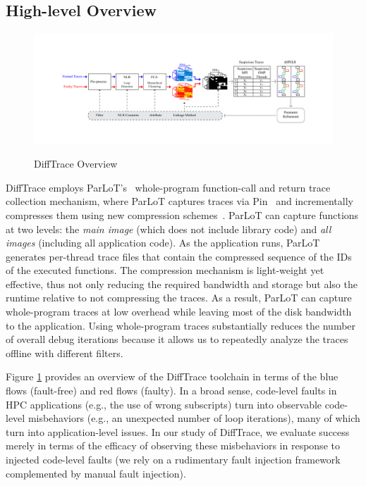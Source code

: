 \subsection{High-level Overview}

\begin{figure}[]
\caption{DiffTrace Overview}
\includegraphics[width=1\textwidth]{figs/overview2.pdf}
\label{fig.diffTraceOverview}
\end{figure}

DiffTrace employs
ParLoT's~\cite{ParLoT} whole-program function-call and return trace collection
mechanism, where ParLoT captures traces
via Pin~\cite{pin} and incrementally compresses them using new
compression schemes~\cite{martin-compression-paper}.
%
ParLoT can capture functions at two levels:
the \textit{main image} (which does not include library code)
and \textit{all images} (including all application code).
%
As the application runs,
ParLoT generates per-thread trace files that
contain the compressed sequence of the IDs of the executed functions.
%
The compression mechanism is light-weight yet effective,
thus not only reducing the required bandwidth and storage but also the
runtime relative to not compressing the traces.
As a result, ParLoT can capture whole-program traces at low overhead
while leaving most of the disk bandwidth to the application. 
%
Using whole-program traces substantially reduces the number of overall
debug iterations because it allows us to repeatedly analyze the
traces offline with different filters.


Figure \ref{fig.diffTraceOverview} provides an overview
of the DiffTrace toolchain
in terms of the blue flows (fault-free) and red flows
(faulty).
%
In a broad sense,
code-level faults in HPC applications (e.g.,
the use of wrong subscripts) turn into observable code-level
misbehaviors
(e.g., an unexpected number of loop iterations), many of which
turn into application-level issues.
%
In our study of DiffTrace, we evaluate
success merely in terms of the efficacy of observing
these misbehaviors in response to injected code-level
faults (we rely on a rudimentary fault injection framework
complemented by manual fault injection).

